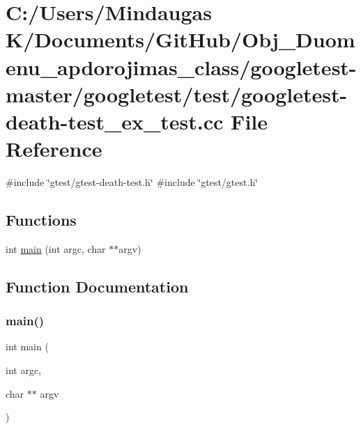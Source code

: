 \hypertarget{googletest-master_2googletest_2test_2googletest-death-test__ex__test_8cc}{}\section{C\+:/\+Users/\+Mindaugas K/\+Documents/\+Git\+Hub/\+Obj\+\_\+\+Duomenu\+\_\+apdorojimas\+\_\+class/googletest-\/master/googletest/test/googletest-\/death-\/test\+\_\+ex\+\_\+test.cc File Reference}
\label{googletest-master_2googletest_2test_2googletest-death-test__ex__test_8cc}
{\ttfamily \#include \char`\"{}gtest/gtest-\/death-\/test.\+h\char`\"{}}\newline
{\ttfamily \#include \char`\"{}gtest/gtest.\+h\char`\"{}}\newline
\subsection*{Functions}
\begin{DoxyCompactItemize}
\item 
int \mbox{\hyperlink{googletest-master_2googletest_2test_2googletest-death-test__ex__test_8cc_a3c04138a5bfe5d72780bb7e82a18e627}{main}} (int argc, char $\ast$$\ast$argv)
\end{DoxyCompactItemize}


\subsection{Function Documentation}
\mbox{\label{googletest-master_2googletest_2test_2googletest-death-test__ex__test_8cc_a3c04138a5bfe5d72780bb7e82a18e627}} 
\subsubsection{\texorpdfstring{main()}{main()}}
{\footnotesize\ttfamily int main (\begin{DoxyParamCaption}\item[{int}]{argc,  }\item[{char $\ast$$\ast$}]{argv }\end{DoxyParamCaption})}

